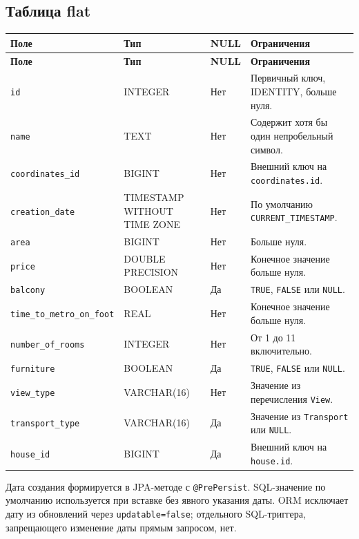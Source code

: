 \documentclass[12pt,a4paper]{article}
\begin{document}
\subsection{Таблица flat}
\begin{longtable}{|p{4.8cm}|p{2.5cm}|p{1.6cm}|p{4.3cm}|}
\hline
\textbf{Поле} & \textbf{Тип} & \textbf{NULL} & \textbf{Ограничения} \\ \hline
\endfirsthead
\hline
\textbf{Поле} & \textbf{Тип} & \textbf{NULL} & \textbf{Ограничения} \\ \hline
\endhead
\texttt{id} & INTEGER & Нет & Первичный ключ, IDENTITY, больше нуля. \\ \hline
\texttt{name} & TEXT & Нет & Содержит хотя бы один непробельный символ. \\ \hline
\texttt{coordinates\_id} & BIGINT & Нет & Внешний ключ на \texttt{coordinates.id}. \\ \hline
\texttt{creation\_date} & TIMESTAMP WITHOUT TIME ZONE & Нет & По умолчанию \texttt{CURRENT\_TIMESTAMP}. \\ \hline
\texttt{area} & BIGINT & Нет & Больше нуля. \\ \hline
\texttt{price} & DOUBLE PRECISION & Нет & Конечное значение больше нуля. \\ \hline
\texttt{balcony} & BOOLEAN & Да & \texttt{TRUE}, \texttt{FALSE} или \texttt{NULL}. \\ \hline
\texttt{time\_to\_metro\_on\_foot} & REAL & Нет & Конечное значение больше нуля. \\ \hline
\texttt{number\_of\_rooms} & INTEGER & Нет & От 1 до 11 включительно. \\ \hline
\texttt{furniture} & BOOLEAN & Да & \texttt{TRUE}, \texttt{FALSE} или \texttt{NULL}. \\ \hline
\texttt{view\_type} & VARCHAR(16) & Нет & Значение из перечисления \texttt{View}. \\ \hline
\texttt{transport\_type} & VARCHAR(16) & Да & Значение из \texttt{Transport} или \texttt{NULL}. \\ \hline
\texttt{house\_id} & BIGINT & Да & Внешний ключ на \texttt{house.id}. \\ \hline
\end{longtable}

Дата создания формируется в JPA-методе с \texttt{@PrePersist}. SQL-значение
по умолчанию используется при вставке без явного указания даты. ORM исключает
дату из обновлений через \texttt{updatable=false}; отдельного SQL-триггера,
запрещающего изменение даты прямым запросом, нет.
\end{document}
